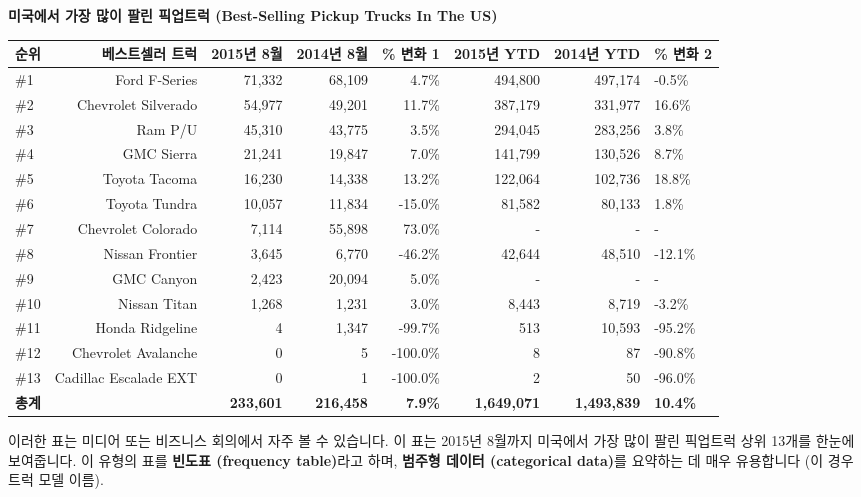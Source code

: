 \documentclass[11pt,a4paper]{article}
\theoremstyle{definition}
\begin{document}
\begin{examplebox}
\textbf{미국에서 가장 많이 팔린 픽업트럭 (Best-Selling Pickup Trucks In The US)}

\begin{center}
\label{tab:pickup_trucks}
\begin{adjustbox}{width=\textwidth, center}
\begin{tabular}{lrrrrrr}
\toprule
\textbf{순위} & \textbf{베스트셀러 트럭} & \textbf{2015년 8월} & \textbf{2014년 8월} & \textbf{\% 변화 1} & \textbf{2015년 YTD} & \textbf{2014년 YTD} & \textbf{\% 변화 2} \\
\midrule
\#1 & Ford F-Series & 71,332 & 68,109 & 4.7\% & 494,800 & 497,174 & -0.5\% \\
\#2 & Chevrolet Silverado & 54,977 & 49,201 & 11.7\% & 387,179 & 331,977 & 16.6\% \\
\#3 & Ram P/U & 45,310 & 43,775 & 3.5\% & 294,045 & 283,256 & 3.8\% \\
\#4 & GMC Sierra & 21,241 & 19,847 & 7.0\% & 141,799 & 130,526 & 8.7\% \\
\#5 & Toyota Tacoma & 16,230 & 14,338 & 13.2\% & 122,064 & 102,736 & 18.8\% \\
\#6 & Toyota Tundra & 10,057 & 11,834 & -15.0\% & 81,582 & 80,133 & 1.8\% \\
\#7 & Chevrolet Colorado & 7,114 & 55,898 & 73.0\% & - & - & - \\ %
\#8 & Nissan Frontier & 3,645 & 6,770 & -46.2\% & 42,644 & 48,510 & -12.1\% \\
\#9 & GMC Canyon & 2,423 & 20,094 & 5.0\% & - & - & - \\ %
\#10 & Nissan Titan & 1,268 & 1,231 & 3.0\% & 8,443 & 8,719 & -3.2\% \\
\#11 & Honda Ridgeline & 4 & 1,347 & -99.7\% & 513 & 10,593 & -95.2\% \\
\#12 & Chevrolet Avalanche & 0 & 5 & -100.0\% & 8 & 87 & -90.8\% \\
\#13 & Cadillac Escalade EXT & 0 & 1 & -100.0\% & 2 & 50 & -96.0\% \\
\midrule
\textbf{총계} & & \textbf{233,601} & \textbf{216,458} & \textbf{7.9\%} & \textbf{1,649,071} & \textbf{1,493,839} & \textbf{10.4\%} \\
\bottomrule
\end{tabular}
\end{adjustbox}
\end{center}
이러한 표는 미디어 또는 비즈니스 회의에서 자주 볼 수 있습니다. 이 표는 2015년 8월까지 미국에서 가장 많이 팔린 픽업트럭 상위 13개를 한눈에 보여줍니다. 이 유형의 표를 \textbf{빈도표 (frequency table)}라고 하며, \textbf{범주형 데이터 (categorical data)}를 요약하는 데 매우 유용합니다 (이 경우 트럭 모델 이름).


\end{examplebox}
\end{document}
